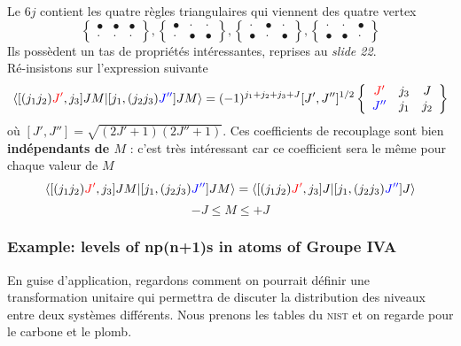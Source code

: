 Le $6j$ contient les quatre règles triangulaires qui viennent des quatre vertex
\begin{equation}
\left\{ \begin{array}{ccc}
\bullet  & \bullet & \bullet \\ \cdot & \cdot & \cdot \end{array} 
\right\},
\left\{ \begin{array}{ccc}
\bullet  & \cdot & \cdot \\ \cdot & \bullet & \bullet \end{array} 
\right\},
\left\{ \begin{array}{ccc}
\cdot & \bullet & \cdot \\ \bullet & \cdot & \bullet \end{array} 
\right\},
\left\{ \begin{array}{ccc}
\cdot & \cdot & \bullet \\ \bullet & \bullet & \cdot \end{array} 
\right\}
\end{equation}
Ils possèdent un tas de propriétés intéressantes, reprises au \textit{slide 22}.\\

Ré-insistons sur l'expression suivante
\begin{equation}
\langle [ (j_1 j_2) {\color{red} J'}, j_3 ] JM
\vert [ j_1, (j_2 j_3) {\color{blue} J''}]  J M \rangle=
(-1)^{j_1 + j_2 + j_3 + J} [J',J'']^{1/2}
\left\{
\begin{array}{ccc}
{\color{red} J'}  &  j_3   &   J \\
{\color{blue} J''} &  j_1  & j_2  \end{array}  \right\}
\end{equation}
où $[J',J''] = \sqrt{(2J'+1)(2J''+1)}$. Ces coefficients de recouplage sont bien
\textbf{indépendants de $M$} : c'est très intéressant car ce coefficient sera le même
pour chaque valeur de $M$
\begin{equation}
\langle [ (j_1 j_2) {\color{red} J'}, j_3 ] JM
\vert [ j_1, (j_2 j_3) {\color{blue} J''}]  J M \rangle
= 
\langle [ (j_1 j_2) {\color{red} J'}, j_3 ] J
\vert [ j_1, (j_2 j_3) {\color{blue} J''}]  J  \rangle 
\end{equation}
$$-J \le M \le +J$$


\subsubsection{Example: levels of np(n+1)s in atoms of Groupe IVA}
En guise d'application, regardons comment on pourrait définir une transformation unitaire
qui permettra de discuter la distribution des niveaux entre deux systèmes différents. Nous
prenons les tables du \textsc{nist} et on regarde pour le carbone et le plomb. \\


